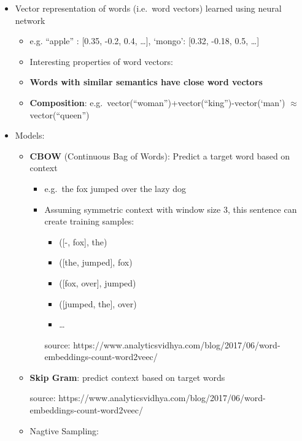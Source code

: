 \documentclass[11pt]{article}
\providecommand{\tightlist}{%
      \setlength{\itemsep}{0pt}\setlength{\parskip}{0pt}}
\begin{document}
\begin{itemize}
\tightlist
\item
  Vector representation of words (i.e.~word vectors) learned using
  neural network

  \begin{itemize}
  \tightlist
  \item
    e.g. ``apple'' : {[}0.35, -0.2, 0.4, \ldots{}{]}, `mongo': {[}0.32,
    -0.18, 0.5, \ldots{}{]}
  \item
    Interesting properties of word vectors:
  \item
    \textbf{Words with similar semantics have close word vectors}
  \item
    \textbf{Composition}:
    e.g.~vector(``woman'')+vector(``king'')-vector(`man') \(\approx\)
    vector(``queen'')
  \end{itemize}
\item
  Models:

  \begin{itemize}
  \item
    \textbf{CBOW} (Continuous Bag of Words): Predict a target word based
    on context

    \begin{itemize}
    \tightlist
    \item
      e.g.~the fox jumped over the lazy dog
    \item
      Assuming symmetric context with window size 3, this sentence can
      create training samples:

      \begin{itemize}
      \tightlist
      \item
        ({[}-, fox{]}, the)
      \item
        ({[}the, jumped{]}, fox)
      \item
        ({[}fox, over{]}, jumped)
      \item
        ({[}jumped, the{]}, over)
      \item
        \ldots{}
      \end{itemize}

       source:
      https://www.analyticsvidhya.com/blog/2017/06/word-embeddings-count-word2veec/
    \end{itemize}
  \item
    \textbf{Skip Gram}: predict context based on target words

     source:
    https://www.analyticsvidhya.com/blog/2017/06/word-embeddings-count-word2veec/
  \item
    Nagtive Sampling:


\end{itemize}
\end{itemize}
\end{document}
